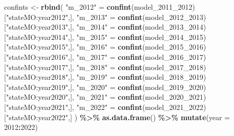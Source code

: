 \documentclass[
]{article}
\newenvironment{Shaded}{\begin{snugshade}}{\end{snugshade}}
\newcommand{\AttributeTok}[1]{\textcolor[rgb]{0.13,0.29,0.53}{#1}}
\newcommand{\DecValTok}[1]{\textcolor[rgb]{0.00,0.00,0.81}{#1}}
\newcommand{\FunctionTok}[1]{\textcolor[rgb]{0.13,0.29,0.53}{\textbf{#1}}}
\newcommand{\NormalTok}[1]{#1}
\newcommand{\OtherTok}[1]{\textcolor[rgb]{0.56,0.35,0.01}{#1}}
\newcommand{\SpecialCharTok}[1]{\textcolor[rgb]{0.81,0.36,0.00}{\textbf{#1}}}
\newcommand{\StringTok}[1]{\textcolor[rgb]{0.31,0.60,0.02}{#1}}
\begin{document}
\begin{Shaded}
\begin{Highlighting}[]
\NormalTok{confints }\OtherTok{\textless{}{-}} \FunctionTok{rbind}\NormalTok{(}
\StringTok{"m\_2012"} \OtherTok{=} \FunctionTok{confint}\NormalTok{(model\_2011\_2012)[}\StringTok{"stateMO:year2012"}\NormalTok{,], }\StringTok{"m\_2013"} \OtherTok{=} \FunctionTok{confint}\NormalTok{(model\_2012\_2013)[}\StringTok{"stateMO:year2013"}\NormalTok{,], }\StringTok{"m\_2014"} \OtherTok{=} \FunctionTok{confint}\NormalTok{(model\_2013\_2014)[}\StringTok{"stateMO:year2014"}\NormalTok{,], }\StringTok{"m\_2015"} \OtherTok{=} \FunctionTok{confint}\NormalTok{(model\_2014\_2015)[}\StringTok{"stateMO:year2015"}\NormalTok{,],}
\StringTok{"m\_2016"} \OtherTok{=} \FunctionTok{confint}\NormalTok{(model\_2015\_2016)[}\StringTok{"stateMO:year2016"}\NormalTok{,],}
\StringTok{"m\_2017"} \OtherTok{=} \FunctionTok{confint}\NormalTok{(model\_2016\_2017)[}\StringTok{"stateMO:year2017"}\NormalTok{,],}
\StringTok{"m\_2018"} \OtherTok{=} \FunctionTok{confint}\NormalTok{(model\_2017\_2018)[}\StringTok{"stateMO:year2018"}\NormalTok{,],}
\StringTok{"m\_2019"} \OtherTok{=} \FunctionTok{confint}\NormalTok{(model\_2018\_2019)[}\StringTok{"stateMO:year2019"}\NormalTok{,],}
\StringTok{"m\_2020"} \OtherTok{=} \FunctionTok{confint}\NormalTok{(model\_2019\_2020)[}\StringTok{"stateMO:year2020"}\NormalTok{,],}
\StringTok{"m\_2021"} \OtherTok{=} \FunctionTok{confint}\NormalTok{(model\_2020\_2021)[}\StringTok{"stateMO:year2021"}\NormalTok{,],}
\StringTok{"m\_2022"} \OtherTok{=} \FunctionTok{confint}\NormalTok{(model\_2021\_2022)[}\StringTok{"stateMO:year2022"}\NormalTok{,]}
\NormalTok{) }\SpecialCharTok{\%\textgreater{}\%} \FunctionTok{as.data.frame}\NormalTok{() }\SpecialCharTok{\%\textgreater{}\%}
  \FunctionTok{mutate}\NormalTok{(}\AttributeTok{year =} \DecValTok{2012}\SpecialCharTok{:}\DecValTok{2022}\NormalTok{)}
\end{Highlighting}
\end{Shaded}
\end{document}
